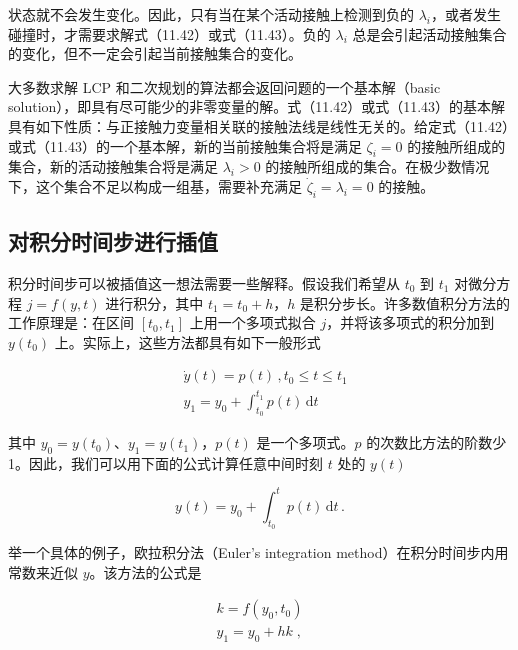 \documentclass[10pt,a4paper]{book}
\theoremstyle{thmstyle} %
\theoremstyle{defstyle} %
\theoremstyle{prostyle} %
\begin{document}
状态就不会发生变化。因此，只有当在某个活动接触上检测到负的 $\lambda_{i}$，或者发生碰撞时，才需要求解式（11.42）或式（11.43）。负的 $\lambda_{i}$ 总是会引起活动接触集合的变化，但不一定会引起当前接触集合的变化。



大多数求解 LCP 和二次规划的算法都会返回问题的一个基本解（basic solution），即具有尽可能少的非零变量的解。式（11.42）或式（11.43）的基本解具有如下性质：与正接触力变量相关联的接触法线是线性无关的。给定式（11.42）或式（11.43）的一个基本解，新的当前接触集合将是满足 $\zeta_{i}=0$ 的接触所组成的集合，新的活动接触集合将是满足 $\lambda_{i}>0$ 的接触所组成的集合。在极少数情况下，这个集合不足以构成一组基，需要补充满足 $\dot{\zeta}_{i}=\lambda_{i}=0$ 的接触。



\subsection{对积分时间步进行插值}





积分时间步可以被插值这一想法需要一些解释。假设我们希望从 $t_0$ 到 $t_1$ 对微分方程 $j = f(y, t)$ 进行积分，其中 $t_1 = t_0 + h$，$h$ 是积分步长。许多数值积分方法的工作原理是：在区间 $[t_0, t_1]$ 上用一个多项式拟合 $j$，并将该多项式的积分加到 $y(t_0)$ 上。实际上，这些方法都具有如下一般形式



$$
\begin{array}{rl} & { \dot { y } ( t ) = p ( t ) \, ,  t _ { 0 } \leq t \leq t _ { 1 } } \\& { y _ { 1 } = y _ { 0 } + \int _ { t _ { 0 } } ^{t _ { 1} } p ( t ) \, \mathrm { d } t } \end{array}
$$



其中 $y_{0}=y(t_{0})$、$y_{1}=y(t_{1})$，$p(t)$ 是一个多项式。$p$ 的次数比方法的阶数少 1。因此，我们可以用下面的公式计算任意中间时刻 $t$ 处的 $y(t)$



$$
y ( t ) = y _ { 0 } + \int _ { t _ { 0 } } ^{t} p ( t ) \, \mathrm { d } t \, .
$$



举一个具体的例子，欧拉积分法（Euler's integration method）在积分时间步内用常数来近似 $y$。该方法的公式是



$$
\begin{array}{r} { k = f ( y _ { 0 } , t _ { 0 } ) } \\{ y _ { 1 } = y _ { 0 } + h k \; , } \end{array}
$$
\end{document}
